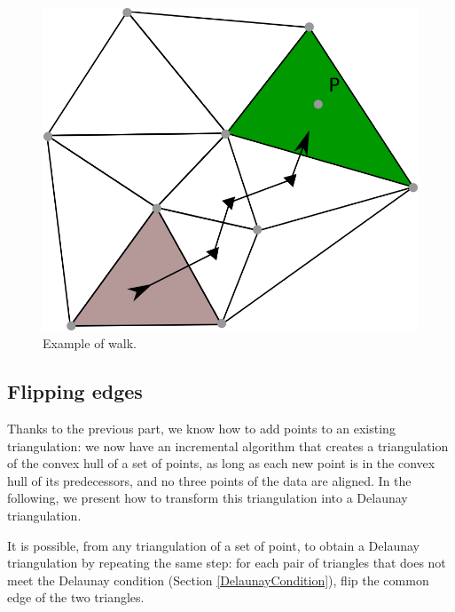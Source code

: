 \documentclass[a4paper,10pt]{article}
\begin{document}
\begin{figure}
  \centering
\includegraphics[scale=1]{Walk}
  \caption{\label{walk} Example of walk.}
\end{figure}

\subsection{Flipping edges}
\label{step2}

Thanks to the previous part, we know how to add points to an existing triangulation: we now have an incremental algorithm that creates a triangulation of the convex hull of a set of points, as long as each new point is in the convex hull of its predecessors, and no three points of the data are aligned. In the following, we present how to transform this triangulation into a Delaunay triangulation.

It is possible, from any triangulation of a set of point, to obtain a Delaunay triangulation by repeating the same step: for each pair of triangles that does not meet the Delaunay condition (Section \ref{DelaunayCondition}), flip the common edge of the two triangles.
\end{document}
